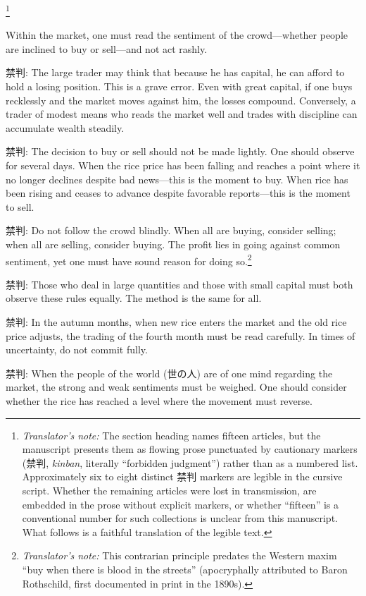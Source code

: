 \documentclass[10pt, openany]{book}
\newcommand{\jp}[1]{{\japanesefont #1}}
\newcommand{\tn}[1]{\footnote{\textit{Translator's note:} #1}}
\begin{document}
\vspace{0.5em}

\tn{The section heading names fifteen articles, but the manuscript presents
them as flowing prose punctuated by cautionary markers (\jp{禁判},
\textit{kinban}, literally ``forbidden judgment'') rather than as a numbered
list. Approximately six to eight distinct \jp{禁判} markers are legible in
the cursive script. Whether the remaining articles were lost in
transmission, are embedded in the prose without explicit markers, or whether
``fifteen'' is a conventional number for such collections is unclear from
this manuscript. What follows is a faithful translation of the legible
text.}

Within the market, one must read the sentiment of the crowd---whether people
are inclined to buy or sell---and not act rashly.

\jp{禁判}: The large trader may think that because he has capital, he can
afford to hold a losing position. This is a grave error. Even with great
capital, if one buys recklessly and the market moves against him, the losses
compound. Conversely, a trader of modest means who reads the market well
and trades with discipline can accumulate wealth steadily.

\jp{禁判}: The decision to buy or sell should not be made lightly. One
should observe for several days. When the rice price has been falling and
reaches a point where it no longer declines despite bad news---this is the
moment to buy. When rice has been rising and ceases to advance despite
favorable reports---this is the moment to sell.

\jp{禁判}: Do not follow the crowd blindly. When all are buying, consider
selling; when all are selling, consider buying. The profit lies in going
against common sentiment, yet one must have sound reason for doing
so.\tn{This contrarian principle predates the Western maxim ``buy when
there is blood in the streets'' (apocryphally attributed to Baron
Rothschild, first documented in print in the 1890s).}

\jp{禁判}: Those who deal in large quantities and those with small capital
must both observe these rules equally. The method is the same for all.

\jp{禁判}: In the autumn months, when new rice enters the market and the
old rice price adjusts, the trading of the fourth month must be read
carefully. In times of uncertainty, do not commit fully.

\jp{禁判}: When the people of the world (\jp{世の人}) are of one mind
regarding the market, the strong and weak sentiments must be weighed. One
should consider whether the rice has reached a level where the movement
must reverse.
\end{document}
